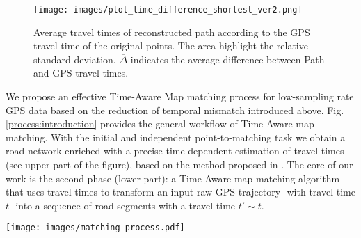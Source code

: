 \documentclass[5p]{elsarticle}
\begin{document}
\begin{figure}[h!]

\centering
\texttt{[image: images/plot\_time\_difference\_shortest\_ver2.png]}
\caption{Average travel times of reconstructed path according to the GPS travel time of the original points. The area highlight the relative standard deviation. $\overline{\Delta}$ indicates the average difference between Path and
GPS travel times.
}
\label{plot_difference}
\end{figure}

We propose an effective Time-Aware Map matching process for low-sampling rate GPS data based on the reduction of temporal mismatch introduced above. Fig. \ref{process:introduction} provides
the general workflow of Time-Aware map matching. With the initial and independent point-to-matching task  we obtain a road network enriched with a precise time-dependent estimation of
travel times (see upper part of the figure), based on the method proposed in \cite{cintia2013gravity}. The core of our work is the second phase (lower part): a Time-Aware map matching algorithm that uses travel times to transform an input raw GPS trajectory -with travel time $t$- into a 
sequence of road segments with a travel time $t'\sim t$. 
\begin{figure*}[t!]

\centering
\texttt{[image: images/matching-process.pdf]}
\caption{A graphical representation of Time-Aware map-matching process }
\label{process:introduction}
\end{figure*}
\end{document}
